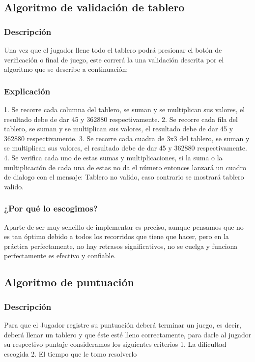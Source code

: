 \documentclass[a4paper,11pt]{article}
\begin{document}
\subsection{Algoritmo de validación de tablero}
\subsubsection{Descripción}
Una vez que el jugador llene todo el tablero podrá presionar el botón de verificación o final de juego, este correrá la una validación descrita por el algoritmo que se describe a continuación:

\subsubsection{Explicación}
1.	Se recorre cada columna del tablero, se suman y se multiplican sus valores, el resultado debe de dar 45 y 362880 respectivamente.
2.	Se recorre cada fila del tablero, se suman y se multiplican sus valores, el resultado debe de dar 45 y 362880 respectivamente.
3.	Se recorre cada cuadra de 3x3 del tablero, se suman y se multiplican sus valores, el resultado debe de dar 45 y 362880 respectivamente.
4.	Se verifica cada uno de estas sumas y multiplicaciones, si la suma o la multiplicación de cada una de estas no da el número entonces lanzará un cuadro de dialogo con el mensaje: Tablero no valido, caso contrario se mostrará tablero valido.

\subsubsection{¿Por qué lo escogimos?}
Aparte de ser muy sencillo de implementar es preciso, aunque pensamos que no es tan óptimo debido a todos los recorridos que tiene que hacer, pero en la práctica perfectamente, no hay retrasos significativos, no se cuelga y funciona perfectamente es efectivo y confiable.

\subsection{Algoritmo de puntuación}
\subsubsection{Descripción}
	Para que el Jugador registre su puntuación deberá terminar un juego, es decir, deberá llenar un tablero y que éste esté lleno correctamente, para darle al jugador su respectivo puntaje consideramos los siguientes criterios
1.	La dificultad escogida
2.	El tiempo que le tomo resolverlo
\end{document}
